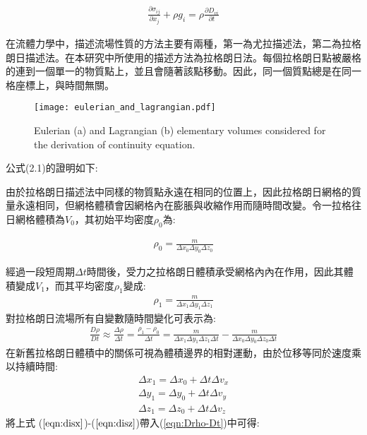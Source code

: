 \begin{align}
\frac{\partial \sigma_{ij}}{\partial x_j}+\rho g_i = \rho \frac{\partial D_{vi}}{\partial t} 
\end{align}

在流體力學中，描述流場性質的方法主要有兩種，第一為尤拉描述法，第二為拉格朗日描述法。在本研究中所使用的描述方法為拉格朗日法。每個拉格朗日點被嚴格的連到一個單一的物質點上，並且會隨著該點移動。因此，同一個質點總是在同一格座標上，與時間無關。

\begin{figure*}[ht!]
    \centering
    \texttt{[image: eulerian\_and\_lagrangian.pdf]}
    \caption{ Eulerian (a) and Lagrangian (b) elementary volumes considered for the derivation of continuity equation. }
    \label{fig::Lagrangian Volume}
\end{figure*}

公式(2.1)的證明如下:

由於拉格朗日描述法中同樣的物質點永遠在相同的位置上，因此拉格朗日網格的質量永遠相同，但網格體積會因網格內在膨脹與收縮作用而隨時間改變。令一拉格往日網格體積為$V_0$，其初始平均密度$\rho_0$為:

\begin{align}
\rho_0 = \frac{m}{\Delta x_0 \Delta y_0 \Delta z_0}
\end{align}

經過一段短周期$\Delta t$時間後，受力之拉格朗日體積承受網格內內在作用，因此其體積變成$V_1$，而其平均密度$\rho_1$變成:
\begin{align}
\rho_1 = \frac{m}{\Delta x_1 \Delta y_1 \Delta z_1}
\end{align}
對拉格朗日流場所有自變數隨時間變化可表示為:
\begin{align}
\frac{D\rho}{Dt} \approx \frac{\Delta \rho}{\Delta t} = \frac{\rho_1-\rho_0}{\Delta t}=\frac{m}{\Delta x_1 \Delta y_1 \Delta z_1\Delta t}-\frac{m}{\Delta x_0 \Delta y_0 \Delta z_0\Delta t}\label{eqn:Drho-Dt}
\end{align}
在新舊拉格朗日體積中的關係可視為體積邊界的相對運動，由於位移等同於速度乘以持續時間:
\begin{align}
\Delta x_1 = \Delta x_0+\Delta t\Delta v_x\label{eqn:disx}\\ 
\Delta y_1 = \Delta y_0+\Delta t\Delta v_y\label{eqn:disy}\\
\Delta z_1 = \Delta z_0+\Delta t\Delta v_z\label{eqn:disz}
\end{align}
將上式 ($\ref{eqn:disx}$)-($\ref{eqn:disz}$)帶入(\ref{eqn:Drho-Dt})中可得:

